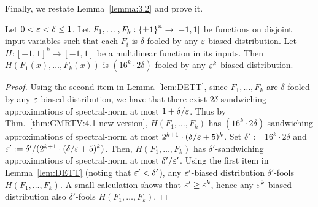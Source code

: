 Finally, we restate Lemma~\ref{lemma:3.2} and prove it.
\begin{lemma}
	Let $0 < \varepsilon< \delta\le 1$.
 	Let $F_1, \ldots, F_k : {\{\pm1\}}^n \to [-1,1]$ be functions on disjoint input variables such that each $F_i$ is $\delta$-fooled by any $\varepsilon$-biased distribution.
 	Let $H:[-1,1]^k \to [-1,1]$ be a multilinear function in its inputs.
 	Then $H(F_1(x), \ldots, F_k(x))$ is $(16^k \cdot 2\delta)$-fooled by any $\varepsilon^k$-biased distribution.
\end{lemma}
\begin{proof}
	Using the second item in Lemma~\ref{lem:DETT}, since $F_1, \ldots, F_k$ are $\delta$-fooled by any $\varepsilon$-biased distribution, we have that there exist $2\delta$-sandwiching approximations of spectral-norm at most $1  + \delta/\varepsilon$.
	Thus by Thm.~\ref{thm:GMRTV:4.1-new-version}, $H(F_1, \ldots, F_k)$ has $ (16^k \cdot 2 \delta)$-sandwiching approximations of spectral-norm at most $2^{k+1} \cdot (\delta/\varepsilon + 5)^k$.
	Set $\delta' := 16^k \cdot 2 \delta$ and $\varepsilon' := \delta'/(2^{k+1} \cdot (\delta/\varepsilon + 5)^k)$. Then, $H(F_1, \ldots, F_k)$ has $ \delta'$-sandwiching approximations of spectral-norm at most $\delta'/\varepsilon'$.
	Using the first item in Lemma~\ref{lem:DETT} (noting that $\varepsilon'<\delta'$), any $\varepsilon'$-biased distribution $\delta'$-fools $H(F_1, \ldots, F_k)$.
	A small calculation shows that $\varepsilon' \ge \varepsilon^k$, hence any $\varepsilon^k$-biased distribution also $\delta'$-fools $H(F_1, \ldots, F_k)$.
	\end{proof}









